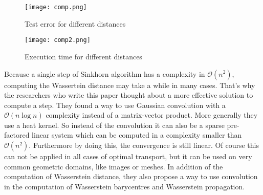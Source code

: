 \begin{figure}[h]
	\centering
	\texttt{[image: comp.png]}
	\caption{Test error for different distances}
	\label{comp}
\end{figure}
\begin{figure}[h]
\centering
\texttt{[image: comp2.png]}
\caption{Execution time for different distances}
\label{comp2}
\end{figure}

\newpage



Because a single step of Sinkhorn algorithm has a complexity in $\mathcal{O}(n^2)$, computing the Wassertein distance may take a while in many cases. That's why the researchers who write this paper thought about a more effective solution to compute a step. They found a way to use Gaussian convolution with a $\mathcal{O}(n \log n)$ complexity instead of a matrix-vector product. More generally they use a heat kernel. So instead of the convolution it can also be a sparse pre-factored linear system which can be computed in a complexity smaller than $\mathcal{O}(n^2)$. Furthermore by doing this, the convergence is still linear. Of course this can not be applied in all cases of optimal transport, but it can be used on very common geometric domains, like images or meshes. In addition of the computation of Wasserstein distance, they also propose a way to use convolution in the computation of Wasserstein barycentres and Wasserstein propagation.


